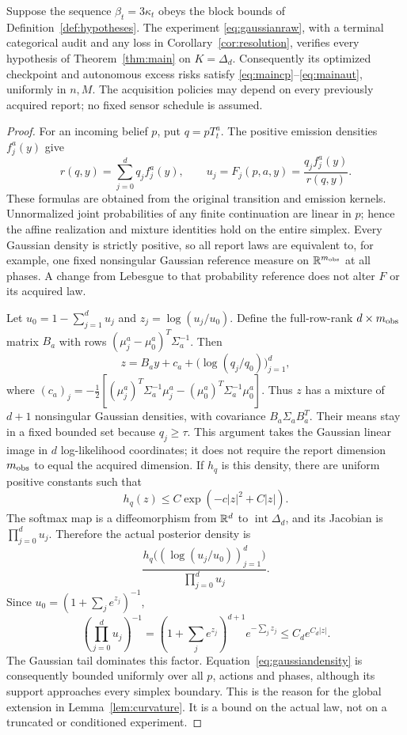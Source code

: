 \begin{theorem}\label{thm:gaussian}
Suppose the sequence $\beta_t=3\kappa_t$ obeys the block bounds of Definition~\ref{def:hypotheses}. The experiment \eqref{eq:gaussianraw}, with a terminal categorical audit and any loss in Corollary~\ref{cor:resolution}, verifies every hypothesis of Theorem~\ref{thm:main} on $K=\Delta_d$. Consequently its optimized checkpoint and autonomous excess risks satisfy \eqref{eq:maincp}--\eqref{eq:mainaut}, uniformly in $n,M$. The acquisition policies may depend on every previously acquired report; no fixed sensor schedule is assumed.
\end{theorem}
\begin{proof}
For an incoming belief $p$, put $q=pT_t^a$. The positive emission densities $f_j^a(y)$ give
\[
 r(q,y)=\sum_{j=0}^d q_jf_j^a(y),\qquad
 u_j=F_j(p,a,y)=\frac{q_jf_j^a(y)}{r(q,y)}.
\]
These formulas are obtained from the original transition and emission kernels. Unnormalized joint probabilities of any finite continuation are linear in $p$; hence the affine realization and mixture identities hold on the entire simplex. Every Gaussian density is strictly positive, so all report laws are equivalent to, for example, one fixed nonsingular Gaussian reference measure on $\mathbb R^{m_{\rm obs}}$ at all phases. A change from Lebesgue to that probability reference does not alter $F$ or its acquired law.

Let $u_0=1-\sum_{j=1}^du_j$ and $z_j=\log(u_j/u_0)$. Define the full-row-rank $d\times m_{\rm obs}$ matrix $B_a$ with rows $(\mu_j^a-\mu_0^a)^T\Sigma_a^{-1}$. Then
\begin{equation}\label{eq:logit}
 z=B_ay+c_a+\bigl(\log(q_j/q_0)\bigr)_{j=1}^d,
\end{equation}
where $(c_a)_j=-\tfrac12[(\mu_j^a)^T\Sigma_a^{-1}\mu_j^a-(\mu_0^a)^T\Sigma_a^{-1}\mu_0^a]$. Thus $z$ has a mixture of $d+1$ nonsingular Gaussian densities, with covariance $B_a\Sigma_aB_a^T$. Their means stay in a fixed bounded set because $q_j\ge\tau$. This argument takes the Gaussian linear image in $d$ log-likelihood coordinates; it does not require the report dimension $m_{\rm obs}$ to equal the acquired dimension. If $h_q$ is this density, there are uniform positive constants such that
\[
 h_q(z)\le C\exp(-c|z|^2+C|z|).
\]
The softmax map is a diffeomorphism from $\mathbb R^d$ to $\operatorname{int}\Delta_d$, and its Jacobian is $\prod_{j=0}^du_j$. Therefore the actual posterior density is
\begin{equation}\label{eq:gaussiandensity}
 \frac{h_q\bigl((\log(u_j/u_0))_{j=1}^d\bigr)}{\prod_{j=0}^du_j}.
\end{equation}
Since $u_0=(1+\sum_je^{z_j})^{-1}$,
\[
 (\textstyle\prod_{j=0}^du_j)^{-1}
 =(1+\sum_je^{z_j})^{d+1}e^{-\sum_jz_j}
 \le C_d e^{C_d|z|}.
\]
The Gaussian tail dominates this factor. Equation~\eqref{eq:gaussiandensity} is consequently bounded uniformly over all $p$, actions and phases, although its support approaches every simplex boundary. This is the reason for the global extension in Lemma~\ref{lem:curvature}. It is a bound on the actual law, not on a truncated or conditioned experiment.


\end{proof}
